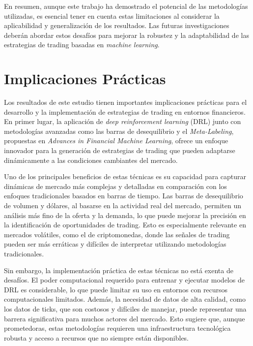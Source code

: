 \documentclass[a4paper,12pt, twoside]{report}
\begin{document}
En resumen, aunque este trabajo ha demostrado el potencial de las metodologías utilizadas, 
es esencial tener en cuenta estas limitaciones al considerar la aplicabilidad y 
generalización de los resultados. Las futuras investigaciones deberán abordar estos 
desafíos para mejorar la robustez y la adaptabilidad de las estrategias de trading basadas 
en \textit{machine learning}.



\section{Implicaciones Prácticas}

Los resultados de este estudio tienen importantes implicaciones prácticas para el desarrollo 
y la implementación de estrategias de trading en entornos financieros. En primer lugar, la 
aplicación de \textit{deep reinforcement learning} (DRL) junto con metodologías avanzadas 
como las barras de desequilibrio y el \textit{Meta-Labeling}, propuestas en \textit{Advances 
in Financial Machine Learning}, ofrece un enfoque innovador para la generación de estrategias de trading que pueden adaptarse dinámicamente a las condiciones cambiantes del mercado.

Uno de los principales beneficios de estas técnicas es su capacidad para capturar dinámicas 
de mercado más complejas y detalladas en comparación con los enfoques tradicionales basados 
en barras de tiempo. Las barras de desequilibrio de volumen y dólares, al basarse en la actividad 
real del mercado, permiten un análisis más fino de la oferta y la demanda, lo que puede mejorar 
la precisión en la identificación de oportunidades de trading. Esto es especialmente relevante 
en mercados volátiles, como el de criptomonedas, donde las señales de trading pueden ser más 
erráticas y difíciles de interpretar utilizando metodologías tradicionales.

Sin embargo, la implementación práctica de estas técnicas no está exenta de desafíos. El 
poder computacional requerido para entrenar y ejecutar modelos de DRL es considerable, 
lo que puede limitar su uso en entornos con recursos computacionales limitados. Además, 
la necesidad de datos de alta calidad, como los datos de ticks, que son costosos y 
difíciles de manejar, puede representar una barrera significativa para muchos actores 
del mercado. Esto sugiere que, aunque prometedoras, estas metodologías requieren una 
infraestructura tecnológica robusta y acceso a recursos que no siempre están disponibles.
\end{document}
